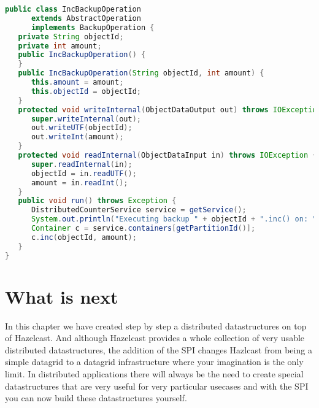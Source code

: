 \begin{lstlisting}[language=java]
public class IncBackupOperation 
      extends AbstractOperation 
      implements BackupOperation {
   private String objectId;
   private int amount;
   public IncBackupOperation() {
   }
   public IncBackupOperation(String objectId, int amount) {
      this.amount = amount;
      this.objectId = objectId;
   }
   protected void writeInternal(ObjectDataOutput out) throws IOException {
      super.writeInternal(out);
      out.writeUTF(objectId);
      out.writeInt(amount);
   }
   protected void readInternal(ObjectDataInput in) throws IOException {
      super.readInternal(in);
      objectId = in.readUTF();
      amount = in.readInt();
   }
   public void run() throws Exception {
      DistributedCounterService service = getService();
      System.out.println("Executing backup " + objectId + ".inc() on: " + getNodeEngine().getThisAddress());
      Container c = service.containers[getPartitionId()];
      c.inc(objectId, amount);
   }
}
\end{lstlisting}


\section{What is next}
In this chapter we have created step by step a distributed datastructures on top of Hazelcast. And although Hazelcast provides a whole collection of very usable distributed datastructures, the addition of the SPI changes Hazlcast from being a simple datagrid to a datagrid infrastructure where your imagination is the only limit. In distributed applications there will always be the need to create special datastructures that are very useful for very particular usecases and with the SPI you can now build these datastructures yourself.